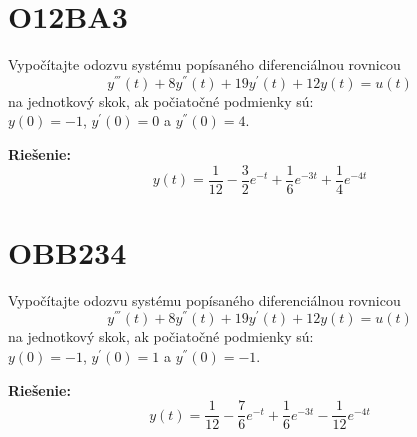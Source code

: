 \documentclass[a4paper, 12pt]{article}
\newenvironment{task}{}{}
\newenvironment{solution}{\noindent\textbf{Riešenie:}}{}
\begin{document}
\section*{O12BA3}
\begin{task}
    Vypočítajte odozvu systému popísaného diferenciálnou rovnicou
    \begin{equation*}
        y^{'''}(t)+8y^{''}(t)+19y^{'}(t)+12y(t)=u(t)
    \end{equation*}
    na jednotkový skok, ak počiatočné podmienky sú: \\
    $y(0)=-1$, $y^{'}(0)=0$ a $y^{''}(0)=4$.
\end{task}

\begin{solution}
    \begin{equation*}
        y(t)=\dfrac{1}{12} - \dfrac{3}{2}e^{-t} + \dfrac{1}{6}e^{-3t} + \dfrac{1}{4}e^{-4t}
    \end{equation*}
\end{solution}


\section*{OBB234}
\begin{task}
    Vypočítajte odozvu systému popísaného diferenciálnou rovnicou
    \begin{equation*}
        y^{'''}(t)+8y^{''}(t)+19y^{'}(t)+12y(t)=u(t)
    \end{equation*}
    na jednotkový skok, ak počiatočné podmienky sú: \\
    $y(0)=-1$, $y^{'}(0)=1$ a $y^{''}(0)=-1$.
\end{task}

\begin{solution}
    \begin{equation*}
        y(t)=\dfrac{1}{12} - \dfrac{7}{6}e^{-t} + \dfrac{1}{6}e^{-3t} - \dfrac{1}{12}e^{-4t}
    \end{equation*}
\end{solution}
\end{document}
